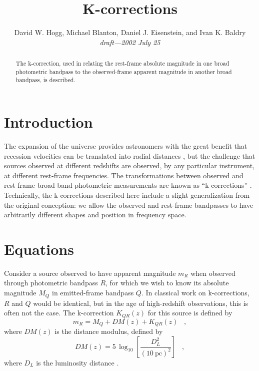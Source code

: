 \documentclass[12pt,preprint]{aastex}
\begin{document}
\title{K-corrections}
\author{
  David W. Hogg,
  Michael Blanton,
  Daniel J. Eisenstein,
  and Ivan K. Baldry\\
  \textsl{draft---2002 July 25}
}

\begin{abstract}
The k-correction, used in relating the rest-frame absolute magnitude
in one broad photometric bandpass to the observed-frame apparent
magnitude in another broad bandpass, is described.
\end{abstract}

\section{Introduction}

The expansion of the universe provides astronomers with the great
benefit that recession velocities can be translated into radial
distances \citep[eg,][and references therein]{hogg99cosm}, but the
challenge that sources observed at different redshifts are observed,
by any particular instrument, at different rest-frame frequencies.
The transformations between observed and rest-frame broad-band
photometric measurements are known as ``k-corrections''
\citep{oke68a}.  Technically, the k-corrections described here include
a slight generalization from the original conception: we allow the
observed and rest-frame bandpasses to have arbitrarily different
shapes and position in frequency space.

\section{Equations}

Consider a source observed to have apparent magnitude $m_R$ when
observed through photometric bandpass $R$, for which we wish to know
its absolute magnitude $M_Q$ in emitted-frame bandpass $Q$.  In
classical work on k-corrections, $R$ and $Q$ would be identical, but
in the age of high-redshift observations, this is often not the case.
The k-correction $K_{QR}(z)$ for this source is defined by
\begin{equation}
\label{eq:definition}
m_R = M_Q + DM(z) + K_{QR}(z) \;\;\;,
\end{equation}
where $DM(z)$ is the distance modulus, defined by
\begin{equation}
DM(z) = 5\,\log_{10}\left[\frac{D_L^2}{(10~\mathrm{pc})^2}\right] \;\;\;,
\end{equation}
where $D_L$ is the luminosity distance \citep[eg,][]{hogg99cosm}.
\end{document}
